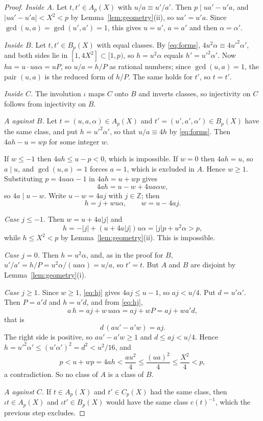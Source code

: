 \documentclass[aps,prd,twocolumn,superscriptaddress,nofootinbib,longbibliography,floatfix,showkeys,nobalancelastpage,amsmath,amssymb,10pt]{revtex4-2}
\theoremstyle{plain}
\theoremstyle{definition}
\theoremstyle{plain}
\newcommand{\cl}{\mathrm{c}}
\begin{document}
\begin{proof}
\emph{Inside $A$.} Let $t,t'\in A_p(X)$ with $u/a\equiv u'/a'$. Then $p\mid ua'-u'a$, and $|ua'-u'a|<X^2<p$ by Lemma~\ref{lem:geometry}(ii), so $ua'=u'a$. Since $\gcd(u,a)=\gcd(u',a')=1$, this gives $u=u'$, $a=a'$ and then $\alpha=\alpha'$.

\emph{Inside $B$.} Let $t,t'\in B_p(X)$ with equal classes. By \eqref{eq:forms}, $4u^2\alpha\equiv4u'^2\alpha'$, and both sides lie in $[1,4X^2]\subset[1,p)$, so $h=u^2\alpha$ equals $h'=u'^2\alpha'$. Now $ha=u\cdot ua\alpha=uP$, so $u/a=h/P$ as rational numbers; since $\gcd(u,a)=1$, the pair $(u,a)$ is the reduced form of $h/P$. The same holds for $t'$, so $t=t'$.

\emph{Inside $C$.} The involution $\iota$ maps $C$ onto $B$ and inverts classes, so injectivity on $C$ follows from injectivity on $B$.

\emph{$A$ against $B$.} Let $t=(u,a,\alpha)\in A_p(X)$ and $t'=(u',a',\alpha')\in B_p(X)$ have the same class, and put $h=u'^2\alpha'$, so that $u/a\equiv4h$ by \eqref{eq:forms}. Then $4ah-u=wp$ for some integer $w$.

If $w\le-1$ then $4ah\le u-p<0$, which is impossible. If $w=0$ then $4ah=u$, so $a\mid u$, and $\gcd(u,a)=1$ forces $a=1$, which is excluded in $A$. Hence $w\ge1$. Substituting $p=4ua\alpha-1$ in $4ah=u+wp$ gives
\[
4ah=u-w+4ua\alpha w,
\]
so $4a\mid u-w$. Write $u-w=4aj$ with $j\in\mathbb{Z}$; then
\begin{equation}\label{eq:hj}
h=j+wu\alpha,\qquad w=u-4aj.
\end{equation}

\emph{Case $j\le-1$.} Then $w=u+4a|j|$ and
\[
h=-|j|+(u+4a|j|)u\alpha=|j|p+u^2\alpha>p,
\]
while $h\le X^2<p$ by Lemma~\ref{lem:geometry}(ii). This is impossible.

\emph{Case $j=0$.} Then $h=u^2\alpha$, and, as in the proof for $B$, $u'/a'=h/P=u^2\alpha/(ua\alpha)=u/a$, so $t'=t$. But $A$ and $B$ are disjoint by Lemma~\ref{lem:geometry}(i).

\emph{Case $j\ge1$.} Since $w\ge1$, \eqref{eq:hj} gives $4aj\le u-1$, so $aj<u/4$. Put $d=u'\alpha'$. Then $P=a'd$ and $h=u'd$, and from \eqref{eq:hj},
\[
a\,h=aj+w\,ua\alpha=aj+wP=aj+wa'd,
\]
that is
\begin{equation}\label{eq:dj}
d\,(au'-a'w)=aj.
\end{equation}
The right side is positive, so $au'-a'w\ge1$ and $d\le aj<u/4$. Hence $h=u'^2\alpha'\le(u'\alpha')^2=d^2<u^2/16$, and
\[
p<u+wp=4ah<\frac{au^2}{4}\le\frac{(ua)^2}{4}\le\frac{X^2}{4}<p,
\]
a contradiction. So no class of $A$ is a class of $B$.

\emph{$A$ against $C$.} If $t\in A_p(X)$ and $t'\in C_p(X)$ had the same class, then $\iota t\in A_p(X)$ and $\iota t'\in B_p(X)$ would have the same class $\cl(t)^{-1}$, which the previous step excludes.
\end{proof}
\end{document}
